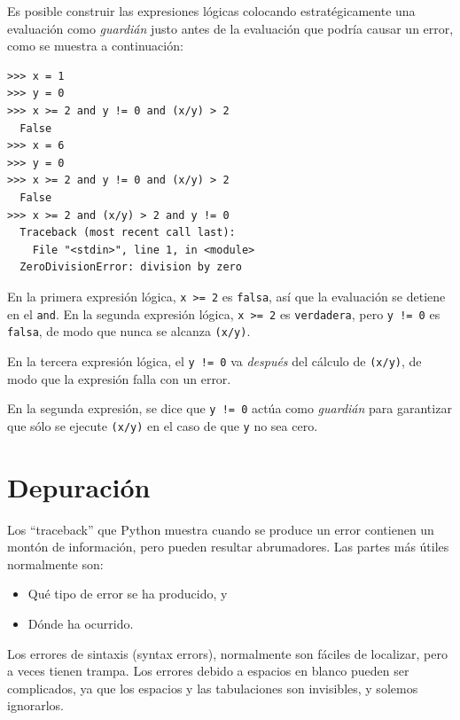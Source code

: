 Es posible construir las expresiones lógicas colocando estratégicamente
una evaluación como \emph{guardián} justo antes de la evaluación que
podría causar un error, como se muestra a continuación:

\begin{Verbatim}[frame=single]
>>> x = 1
>>> y = 0
>>> x >= 2 and y != 0 and (x/y) > 2
  False
>>> x = 6
>>> y = 0
>>> x >= 2 and y != 0 and (x/y) > 2
  False
>>> x >= 2 and (x/y) > 2 and y != 0
  Traceback (most recent call last):
    File "<stdin>", line 1, in <module>
  ZeroDivisionError: division by zero
\end{Verbatim}

En la primera expresión lógica, \texttt{x\ >=\ 2} es \texttt{falsa},
así que la evaluación se detiene en el \texttt{and}. En la segunda
expresión lógica, \texttt{x\ >=\ 2} es \texttt{verdadera}, pero
\texttt{y\ !=\ 0} es \texttt{falsa}, de modo que nunca se alcanza
\texttt{(x/y)}.

En la tercera expresión lógica, el \texttt{y\ !=\ 0} va \emph{después}
del cálculo de \texttt{(x/y)}, de modo que la expresión falla con un
error.

En la segunda expresión, se dice que \texttt{y\ !=\ 0} actúa como
\emph{guardián} para garantizar que sólo se ejecute \texttt{(x/y)} en el
caso de que \texttt{y} no sea cero.



\hypertarget{depuraciuxf3n}{%
\section{Depuración}\label{depuraciuxf3n}}

 

Los ``traceback'' que Python muestra cuando se produce un error
contienen un montón de información, pero pueden resultar abrumadores.
Las partes más útiles normalmente son:

\begin{itemize}
\item
  Qué tipo de error se ha producido, y
\item
  Dónde ha ocurrido.
\end{itemize}

Los errores de sintaxis (syntax errors), normalmente son fáciles de
localizar, pero a veces tienen trampa. Los errores debido a espacios en
blanco pueden ser complicados, ya que los espacios y las tabulaciones
son invisibles, y solemos ignorarlos.


